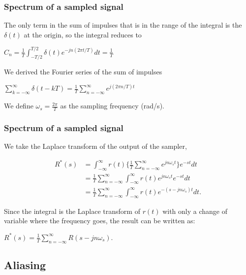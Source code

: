 \begin{frame}
	\frametitle{Spectrum of a sampled signal}
	\vspace{-10ex}
	The only term in the sum of impulses that is in the range of the integral is the $\delta(t)$ at the origin, so the integral reduces to \\
	\begin{center}
		$C_n=\frac{1}{T}\int_{-T/2}^{T/2}\delta(t)e^{-jn(2\pi t/T)}dt=\frac{1}{T}$
	\end{center}
	We derived the Fourier series of the sum of impulses\\
	\begin{center}
		$\sum_{k=-\infty}^{\infty} \delta(t-kT)=\frac{1}{T}\sum_{n=-\infty}^{\infty} e^{j(2\pi n/T)t}$
	\end{center}
	We define $\omega_s = \frac{2\pi}{T}$ as the sampling frequency (rad/s).\\
\end{frame}

\begin{frame}
	\frametitle{Spectrum of a sampled signal}
	We take the Laplace transform of the output of the sampler,
	\vspace{-2ex}
	\begin{center}
		\begin{equation}
			\begin{split}
			R^*(s)& = \int_{-\infty}^{\infty} r(t) \Big\{ \frac{1}{T} \sum_{n=-\infty}^{\infty} e^{jn\omega_st} \Big\} e^{-st} dt\\
			& = \frac{1}{T} \sum_{n=-\infty}^{\infty} \int_{-\infty}^{\infty} r(t) e^{jn\omega_st}e^{-st}dt\\
			& = \frac{1}{T} \sum_{n=-\infty}^{\infty} \int_{-\infty}^{\infty}r(t) e^{-(s-jn\omega_s)t} dt.
			\end{split}
		\end{equation}
	\end{center}
	Since the integral is the Laplace transform of $r(t)$ with only a change of variable where the frequency goes, the result can be written as:\\
	\begin{center}
		$R^*(s)=\frac{1}{T}\sum_{n=-\infty}^{\infty}R(s-jn\omega_s)$.
	\end{center}
\end{frame}

\subsection{Aliasing}

